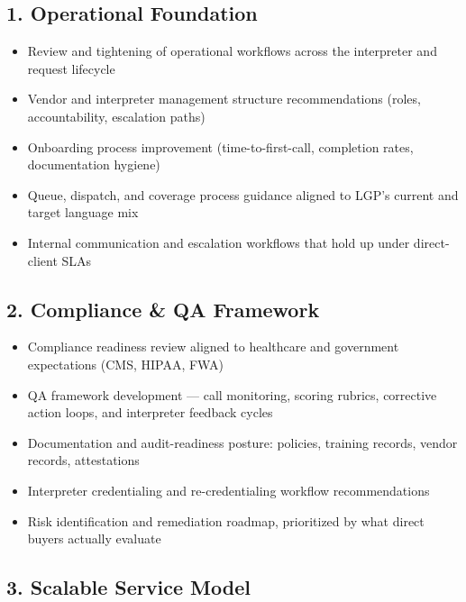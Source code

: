 \documentclass{proposal}
\begin{document}
\subsection{1. Operational Foundation}

\begin{itemize}[leftmargin=1.5em, itemsep=3pt, topsep=2pt]
  \item Review and tightening of operational workflows across the
        interpreter and request lifecycle
  \item Vendor and interpreter management structure recommendations
        (roles, accountability, escalation paths)
  \item Onboarding process improvement (time-to-first-call, completion
        rates, documentation hygiene)
  \item Queue, dispatch, and coverage process guidance aligned to LGP's
        current and target language mix
  \item Internal communication and escalation workflows that hold up under
        direct-client SLAs
\end{itemize}

\subsection{2. Compliance \& QA Framework}

\begin{itemize}[leftmargin=1.5em, itemsep=3pt, topsep=2pt]
  \item Compliance readiness review aligned to healthcare and government
        expectations (CMS, HIPAA, FWA)
  \item QA framework development --- call monitoring, scoring rubrics,
        corrective action loops, and interpreter feedback cycles
  \item Documentation and audit-readiness posture: policies, training
        records, vendor records, attestations
  \item Interpreter credentialing and re-credentialing workflow
        recommendations
  \item Risk identification and remediation roadmap, prioritized by what
        direct buyers actually evaluate
\end{itemize}

\subsection{3. Scalable Service Model}
\end{document}
